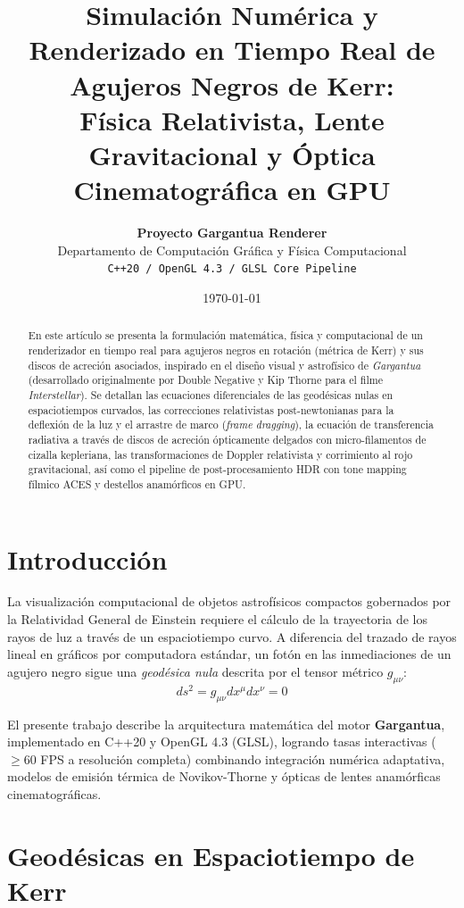 \documentclass[10pt,twocolumn,a4paper]{article}
\title{\textbf{\Large Simulación Numérica y Renderizado en Tiempo Real de Agujeros Negros de Kerr: \\ Física Relativista, Lente Gravitacional y Óptica Cinematográfica en GPU}}
\author{
    \textbf{Proyecto Gargantua Renderer} \\
    Departamento de Computación Gráfica y Física Computacional \\
    \texttt{\small C++20 / OpenGL 4.3 / GLSL Core Pipeline}
}
\date{\today}
\begin{document}
\maketitle

\begin{abstract}
En este artículo se presenta la formulación matemática, física y computacional de un renderizador en tiempo real para agujeros negros en rotación (métrica de Kerr) y sus discos de acreción asociados, inspirado en el diseño visual y astrofísico de \textit{Gargantua} (desarrollado originalmente por Double Negative y Kip Thorne para el filme \textit{Interstellar}). Se detallan las ecuaciones diferenciales de las geodésicas nulas en espaciotiempos curvados, las correcciones relativistas post-newtonianas para la deflexión de la luz y el arrastre de marco (\textit{frame dragging}), la ecuación de transferencia radiativa a través de discos de acreción ópticamente delgados con micro-filamentos de cizalla kepleriana, las transformaciones de Doppler relativista y corrimiento al rojo gravitacional, así como el pipeline de post-procesamiento HDR con tone mapping fílmico ACES y destellos anamórficos en GPU.
\end{abstract}

\section{Introducción}
La visualización computacional de objetos astrofísicos compactos gobernados por la Relatividad General de Einstein requiere el cálculo de la trayectoria de los rayos de luz a través de un espaciotiempo curvo. A diferencia del trazado de rayos lineal en gráficos por computadora estándar, un fotón en las inmediaciones de un agujero negro sigue una \textit{geodésica nula} descrita por el tensor métrico $g_{\mu\nu}$:
\begin{equation}
ds^2 = g_{\mu\nu} dx^\mu dx^\nu = 0
\end{equation}

El presente trabajo describe la arquitectura matemática del motor \textbf{Gargantua}, implementado en C++20 y OpenGL 4.3 (GLSL), logrando tasas interactivas ($\ge 60$ FPS a resolución completa) combinando integración numérica adaptativa, modelos de emisión térmica de Novikov-Thorne y ópticas de lentes anamórficas cinematográficas.

\section{Geodésicas en Espaciotiempo de Kerr}
\end{document}
